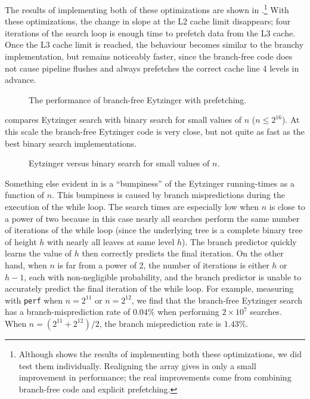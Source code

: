 \documentclass{patmorin}
\begin{document}
The results of implementing both of these optimizations are shown
in .\footnote{Although 
shows the results of implementing both these optimizations, we did test them
individually. Realigning the array gives in only a small improvement in
performance; the real improvements come from combining branch-free code and
explicit prefetching.}  With these optimizations, the change in slope
at the L2 cache limit disappears; four iterations of the search loop is
enough time to prefetch data from the L3 cache.  Once the L3 cache limit
is reached, the behaviour becomes similar to the branchy implementation,
but remains noticeably faster, since the branch-free code does not cause
pipeline flushes and always prefetches the correct cache line 4 levels
in advance.

\begin{figure}
   \caption{The performance of branch-free Eytzinger with prefetching.}
\end{figure}

 compares Eytzinger search with binary search for
small values of $n$ ($n\le 2^{16}$).  At this scale
the branch-free Eytzinger code is very close, but not quite as fast
as the best binary search implementations.  

\begin{figure}
   \caption{Eytzinger versus binary search for small values of $n$.}
\end{figure}

Something else evident in  is a ``bumpiness'' of the
Eytzinger running-times as a function of $n$.  This bumpiness is caused by
branch mispredictions during the execution of the while loop.  The search
times are especially low when $n$ is close to a power of two because
in this case nearly all searches perform the same number of iterations
of the while loop (since the underlying tree is a complete binary tree
of height $h$ with nearly all leaves at same level $h$).  The branch
predictor quickly learns the value of $h$ then correctly predicts the
final iteration.  On the other hand, when $n$ is far from a power of 2,
the number of iterations is either $h$ or $h-1$, each with non-negligible
probability, and the branch predictor is unable to accurately predict
the final iteration of the while loop.  For example, measuring with
\texttt{perf} when $n=2^{11}$ or $n=2^{12}$, we find that the
branch-free Eytzinger search has a branch-misprediction rate of $0.04\%$
when performing $2\times 10^{7}$ searches.  When $n=(2^{11}+2^{12})/2$,
the branch misprediction rate is $1.43\%$.
\end{document}
